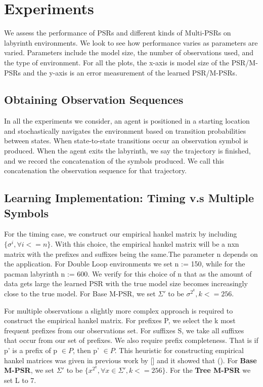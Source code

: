 \section{Experiments}
We assess the performance of PSRs and different kinds of Multi-PSRs on labyrinth environments. We look to see how performance varies as parameters are varied. Parameters include the model size, the number of observations used, and the type of environment. For all the plots, the x-axis is model size of the PSR/M-PSRs and the y-axis is an error measurement of the learned PSR/M-PSRs.

\subsection{Obtaining Observation Sequences}
In all the experiments we consider, an agent is positioned in a starting location and stochastically navigates the environment based on transition probabilities between states. When state-to-state transitions occur an observation symbol is produced. When the agent exits the labyrinth, we say the trajectory is finished, and we record the concatenation of the symbols produced. We call this concatenation the observation sequence for that trajectory.  

\subsection{Learning Implementation: Timing v.s Multiple Symbols}

For the timing case, we construct our empirical hankel matrix by including $\{\sigma^i, \forall i<=n\}$. With this choice, the empirical hankel matrix will be a nxn matrix with the prefixes and suffixes being the same.The parameter n depends on the application. For Double Loop environments we set n := 150, while for the pacman labyrinth n := 600. We verify for this choice of n that as the amount of data gets large the learned PSR with the true model size becomes increasingly close to the true model. For Base M-PSR, we set $\Sigma'$ to be {$\sigma^{2^k}, k<=256 $}.

For multiple observations a slightly more complex approach is required to construct the empirical hankel matrix. For prefixes P, we select the k most frequent prefixes from our observations set. For suffixes S, we take all suffixes that occur from our set of prefixes. We also require prefix completeness. That is if p' is a prefix of p $\in P$, then p' $\in P$. This heuristic for constructing empirical hankel matrices was given in previous work by [] and it showed that (). For \textbf{Base M-PSR}, we set $\Sigma'$ to be $\{x^{2^k},\forall x \in \Sigma', k<=256 \}$. For the \textbf{Tree M-PSR} we set L to 7.

